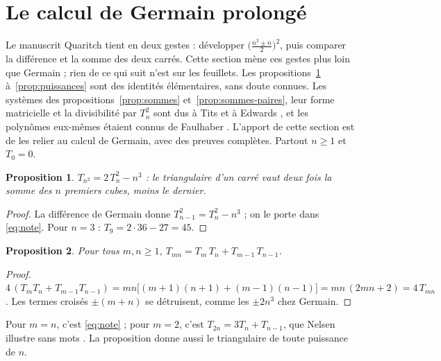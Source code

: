 \documentclass[11pt,a4paper]{article}
\newtheorem{proposition}{Proposition}
\theoremstyle{remark}
\begin{document}
\section{Le calcul de Germain prolongé}\label{sec:prolongements}

Le manuscrit Quaritch tient en deux gestes : développer
$\big(\frac{n^2 \pm n}{2}\big)^2$, puis comparer la différence et la somme des
deux carrés. Cette section mène ces gestes plus loin que Germain ; rien de ce
qui suit n'est sur les feuillets. Les propositions~\ref{prop:nicomaque}
à~\ref{prop:puissances} sont des identités élémentaires, sans doute connues.
Les systèmes des propositions~\ref{prop:sommes} et~\ref{prop:sommes-paires},
leur forme matricielle et la divisibilité par $T_n^2$ sont dus à Tits et à
Edwards \cite{tits,edwards}, et les polynômes eux-mêmes étaient connus de
Faulhaber \cite{knuth}. L'apport de cette section est de les relier au calcul
de Germain, avec des preuves complètes. Partout $n \geq 1$ et
$T_0 = 0$.

\begin{proposition}\label{prop:nicomaque}
$T_{n^2} = 2\,T_n^2 - n^3$ : le triangulaire d'un carré vaut deux fois la
somme des $n$ premiers cubes, moins le dernier.
\end{proposition}

\begin{proof}
La différence de Germain donne $T_{n-1}^2 = T_n^2 - n^3$ ; on le porte dans
\eqref{eq:note}. Pour $n = 3$ : $T_9 = 2 \cdot 36 - 27 = 45$.
\end{proof}

\begin{proposition}\label{prop:produit}
Pour tous $m, n \geq 1$, $T_{mn} = T_m\,T_n + T_{m-1}\,T_{n-1}$.
\end{proposition}

\begin{proof}
$4\,(T_m T_n + T_{m-1} T_{n-1}) = mn\big[(m+1)(n+1) + (m-1)(n-1)\big]
= mn\,(2mn + 2) = 4\,T_{mn}$. Les termes croisés $\pm(m+n)$ se détruisent,
comme les $\pm 2n^3$ chez Germain.
\end{proof}

Pour $m = n$, c'est \eqref{eq:note} ; pour $m = 2$, c'est
$T_{2n} = 3T_n + T_{n-1}$, que Nelsen illustre sans mots \cite[p.~104]{nelsen}. La proposition donne aussi le
triangulaire de toute puissance de $n$.
\end{document}
